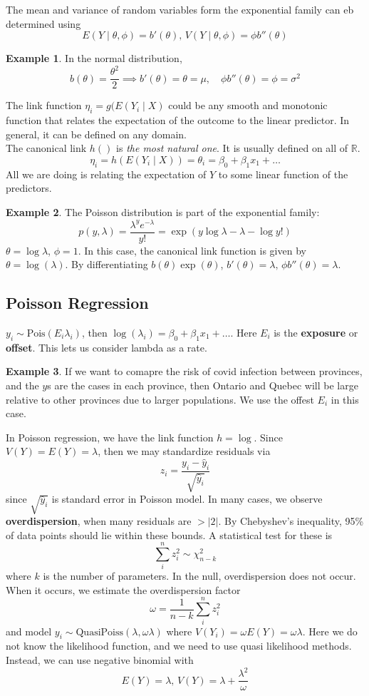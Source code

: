 \documentclass[12pt, a4paper]{article}
\theoremstyle{definition}
\newtheorem{example}{Example}
\newcommand{\R}{\mathbb{R}}                           %
\newcommand{\lam}{\lambda}
\newcommand{\imp}{\implies}
\newcommand{\f}{\frac}
\newcommand{\df}{\dfrac}
\newcommand{\abs}[1]{\left| #1 \right|}
\begin{document}
	The mean and variance of random variables form the exponential family can eb determined using 
	$$
		E(Y \mid \theta, \phi) = b'(\theta),\, 
		V(Y \mid \theta, \phi ) = \phi b''(\theta)
	$$
	\begin{example}
		In the normal distribution, 
		$$
		b(\theta) = \f{\theta^2}{2} \imp b'(\theta) = \theta = \mu,\quad \phi b''(\theta) = \phi = \sigma^2
		$$
	\end{example}
	
	The link function $\eta_i = g(E(Y_i\mid X)$ could be any smooth and monotonic function that relates the expectation of the outcome to the linear predictor. In general, it can be defined on any domain.\\
	
	The canonical link $h()$ is \textit{the most natural one}. It is usually defined on all of $\R$.
	$$
		\eta_i = h(E(Y_i\mid X)) = \theta_i = \beta_0 + \beta_1x_1 + \ldots
	$$
	All we are doing is relating the expectation of $Y$ to some linear function of the predictors.
	\begin{example}
		The Poisson distribution is part of the exponential family:
	$$
		p(y, \lam) = \df{\lam^y e^{-\lam}}{y!} = \exp(y \log \lam - \lam - \log y!)
	$$
	$\theta = \log \lam$, $\phi = 1$. In this case, the canonical link function is given by $\theta = \log(\lam)$. By differentiating $b(\theta) \exp(\theta)$, $b'(\theta) = \lam,\, \phi b''(\theta) = \lam$.
	\end{example}

	\subsection{Poisson Regression}
	$y_i \sim \text{Pois}(E_i\lam_i)$, then $\log(\lam_i) = \beta_0 + \beta_1x_1 + \ldots$. Here $E_i$ is the {\bf exposure} or {\bf offset}. This lets us consider lambda as a rate. 
	
	\begin{example}
		If we want to comapre the risk of covid infection between provinces, and the $y$s are the cases in each province, then Ontario and Quebec will be large relative to other provinces due to larger populations. We use the offest $E_i$ in this case.
	\end{example}

	In Poisson regression, we have the link function $h = \log$. Since $V(Y) = E(Y) = \lam$, then we may standardize residuals via 
	$$
		z_i = \f{y_i - \hat y_i}{\sqrt{\hat y_i}}
	$$
	since $\sqrt{\hat y_i}$ is standard error in Poisson model. In many cases, we observe {\bf overdispersion}, when many residuals are $> \abs{2}$. By Chebyshev's inequality, 95\% of data points should lie within these bounds. A statistical test for these is 
	$$
		\sum_i^n z_i^2 \sim \chi^2_{n-k}
	$$ 
	where $k$ is the number of parameters. In the null, overdispersion does not occur. When it occurs, we estimate the overdispersion factor 
	$$
		\omega = \f{1}{n-k} \sum_i^n z_i^2
	$$
	and model $y_i \sim \text{QuasiPoiss}(\lam, \omega\lam)$ where $V(Y_i) = \omega E(Y) = \omega \lambda$. Here we do not know the likelihood function, and we need to use quasi likelihood methods. Instead, we can use negative binomial with
	$$
		E(Y) = \lam,\, V(Y) = \lam + \df{\lam^2}{\omega}
	$$
	
\end{document}
